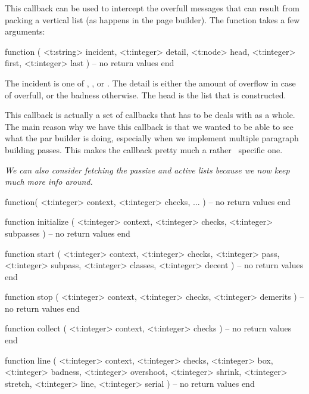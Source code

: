 \stopsubsection

\startsubsection[title=vpack_quality]

This callback can be used to intercept the overfull messages that can result from
packing a vertical list (as happens in the page builder). The function takes a
few arguments:

\starttyping[option=LUA]
function (
    <t:string>  incident,
    <t:integer> detail,
    <t:node>    head,
    <t:integer> first,
    <t:integer> last
)
    -- no return values
end
\stoptyping

The incident is one of , ,  or
. The detail is either the amount of overflow in case of \type
{overfull}, or the badness otherwise. The head is the list that is constructed.

\stopsubsection

\startsubsection[title=line_break]

This callback is actually a set of callbacks that has to be deals with as a
whole. The main reason why we have this callback is that we wanted to be able to
see what the par builder is doing, especially when we implement multiple
paragraph building passes. This makes the callback pretty much a rather \CONTEXT\
specific one.

{\em We can also consider fetching the passive and active lists because we now keep
much more info around.}

\starttyping[option=LUA]
function(
    <t:integer> context,
    <t:integer> checks,
    ...
)
    -- no return values
end
\stoptyping

\starttyping[option=LUA]
function initialize (
    <t:integer> context,
    <t:integer> checks,
    <t:integer> subpasses
)
    -- no return values
end
\stoptyping

\starttyping[option=LUA]
function start (
    <t:integer> context,
    <t:integer> checks,
    <t:integer> pass,
    <t:integer> subpass,
    <t:integer> classes,
    <t:integer> decent
)
    -- no return values
end
\stoptyping

\starttyping[option=LUA]
function stop (
    <t:integer> context,
    <t:integer> checks,
    <t:integer> demerits
)
    -- no return values
end
\stoptyping

\starttyping[option=LUA]
function collect (
    <t:integer> context,
    <t:integer> checks
)
    -- no return values
end
\stoptyping

\starttyping[option=LUA]
function line (
    <t:integer> context,
    <t:integer> checks,
    <t:integer> box,
    <t:integer> badness,
    <t:integer> overshoot,
    <t:integer> shrink,
    <t:integer> stretch,
    <t:integer> line,
    <t:integer> serial
)
    -- no return values
end
\stoptyping

